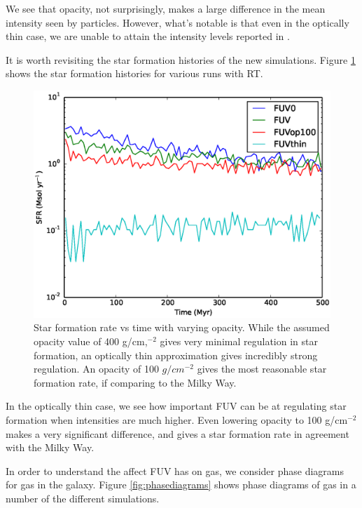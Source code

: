 We see that opacity, not surprisingly, makes a large difference in the mean intensity seen by particles. However, what's notable is that even in the optically thin case, we are unable to attain the intensity levels reported in \citet{wolfireEt03}.

It is worth revisiting the star formation histories of the new simulations. Figure \ref{fig:sfrvtimeRT} shows the star formation histories for various runs with RT.

\begin{figure}
\includegraphics[width=\textwidth]{graphics/sfrvtimeRT.eps}
\caption[Star formation histories for varying opacities.]{Star formation rate vs time with varying opacity. While the assumed opacity value of 400 g/cm,$^{-2}$ gives very minimal regulation in star formation, an optically thin approximation gives incredibly strong regulation. An opacity of 100 $g/cm^{-2}$ gives the most reasonable star formation rate, if comparing to the Milky Way.}
\label{fig:sfrvtimeRT}
\end{figure}

In the optically thin case, we see how important FUV can be at regulating star formation when intensities are much higher. Even lowering opacity to 100 g/cm$^{-2}$ makes a very significant difference, and gives a star formation rate in agreement with the Milky Way.

In order to understand the affect FUV has on gas, we consider phase diagrams for gas in the galaxy. Figure \ref{fig:phasediagrams} shows phase diagrams of gas in a number of the different simulations.

